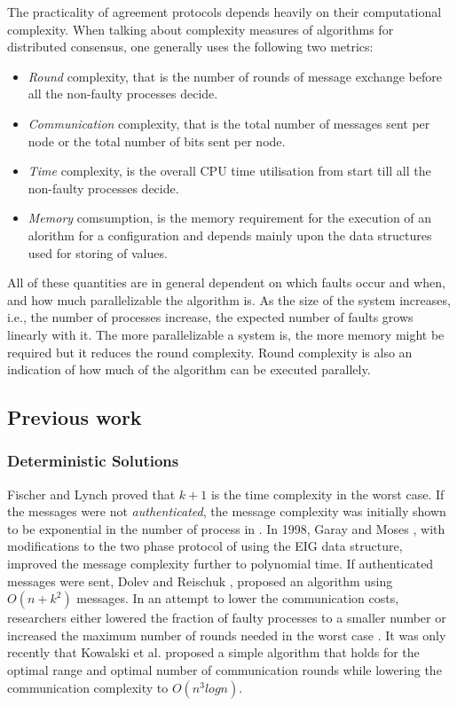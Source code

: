 The practicality of agreement protocols depends heavily on their computational complexity. When talking about complexity measures of algorithms for distributed consensus, one generally uses the following two metrics:
\begin{itemize}
\item \textit{Round} complexity, that is the number of rounds of message exchange before all the non-faulty processes decide.
\item \textit{Communication} complexity, that is the total number of messages sent per node or the total number of bits sent per node.
\item \textit{Time} complexity, is the overall CPU time utilisation from start till all the non-faulty processes decide.
\item \textit{Memory} comsumption, is the memory requirement for the execution of an alorithm for a configuration and depends mainly upon the data structures used for storing of values.
\end{itemize}
All of these quantities are in general dependent on which faults occur and when, and how much parallelizable the algorithm is. As the size of the system increases, i.e., the number of processes increase, the expected number of faults grows linearly with it. The more parallelizable a system is, the more memory might be required but it reduces the round complexity. Round complexity is also an indication of how much of the algorithm can be executed parallely.

\subsection{Previous work}

\subsubsection{Deterministic Solutions}
Fischer and Lynch \cite{Fischer81alower} proved that $k + 1$ is the time complexity in the worst case. If the messages were not \textit{authenticated}, the message complexity was initially shown to be exponential in the number of process in \cite{PeaseSL80}. In 1998, Garay and Moses \cite{GarayM98}, with modifications to the two phase protocol of \cite{BDDS87} using the EIG data structure, improved the message complexity further to polynomial time. If authenticated messages were sent, Dolev and Reischuk \cite{DolevR85}, proposed an algorithm using $O(n + k^2)$ messages. In an attempt to lower the communication costs, researchers either lowered the fraction of faulty processes to a smaller number \cite{} or increased the maximum number of rounds needed in the worst case \cite{}. It was only recently that Kowalski et al. \cite{} proposed a simple algorithm that holds for the optimal range and optimal number of communication rounds while lowering the communication complexity to $O(n^{3}logn)$.

